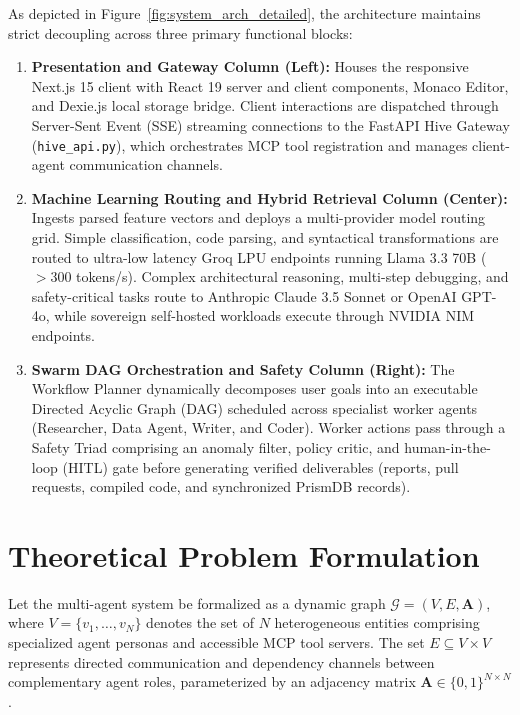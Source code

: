 \documentclass[12pt,a4paper]{report}
\begin{document}
As depicted in Figure~\ref{fig:system_arch_detailed}, the architecture maintains strict decoupling across three primary functional blocks:
\begin{enumerate}
    \item \textbf{Presentation and Gateway Column (Left):} Houses the responsive Next.js 15 client with React 19 server and client components, Monaco Editor, and Dexie.js local storage bridge. Client interactions are dispatched through Server-Sent Event (SSE) streaming connections to the FastAPI Hive Gateway (\texttt{hive\_api.py}), which orchestrates MCP tool registration and manages client-agent communication channels.
    \item \textbf{Machine Learning Routing and Hybrid Retrieval Column (Center):} Ingests parsed feature vectors and deploys a multi-provider model routing grid. Simple classification, code parsing, and syntactical transformations are routed to ultra-low latency Groq LPU endpoints running Llama 3.3 70B ($>300$ tokens/s). Complex architectural reasoning, multi-step debugging, and safety-critical tasks route to Anthropic Claude 3.5 Sonnet or OpenAI GPT-4o, while sovereign self-hosted workloads execute through NVIDIA NIM endpoints.
    \item \textbf{Swarm DAG Orchestration and Safety Column (Right):} The Workflow Planner dynamically decomposes user goals into an executable Directed Acyclic Graph (DAG) scheduled across specialist worker agents (Researcher, Data Agent, Writer, and Coder). Worker actions pass through a Safety Triad comprising an anomaly filter, policy critic, and human-in-the-loop (HITL) gate before generating verified deliverables (reports, pull requests, compiled code, and synchronized PrismDB records).
\end{enumerate}

\section{Theoretical Problem Formulation}
Let the multi-agent system be formalized as a dynamic graph $\mathcal{G} = (V, E, \mathbf{A})$, where $V = \{v_1, \dots, v_N\}$ denotes the set of $N$ heterogeneous entities comprising specialized agent personas and accessible MCP tool servers. The set $E \subseteq V \times V$ represents directed communication and dependency channels between complementary agent roles, parameterized by an adjacency matrix $\mathbf{A} \in \{0, 1\}^{N \times N}$.
\end{document}
